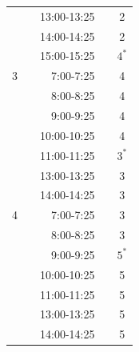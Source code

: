 \documentclass[12pt,a4paper,titlepage]{article}
\begin{document}
\begin{table}[!htb]
\begin{tabular}{lllll}
\multicolumn{1}{c}{} & \multicolumn{1}{c}{} & \multicolumn{1}{r}{13:00-13:25} & \multicolumn{1}{r}{} & \multicolumn{1}{c}{2} \\
\multicolumn{1}{c}{} & \multicolumn{1}{c}{} & \multicolumn{1}{r}{14:00-14:25} & \multicolumn{1}{r}{} & \multicolumn{1}{c}{2} \\
\multicolumn{1}{c}{} & \multicolumn{1}{c}{} & \multicolumn{1}{r}{15:00-15:25} & \multicolumn{1}{r}{} & \multicolumn{1}{c}{$4^*$} \\
\multicolumn{1}{c}{3} & \multicolumn{1}{c}{} & \multicolumn{1}{r}{7:00-7:25} & \multicolumn{1}{r}{} & \multicolumn{1}{c}{4} \\
\multicolumn{1}{c}{} & \multicolumn{1}{c}{} & \multicolumn{1}{r}{8:00-8:25} & \multicolumn{1}{r}{} & \multicolumn{1}{c}{4} \\
\multicolumn{1}{c}{} & \multicolumn{1}{c}{} & \multicolumn{1}{r}{9:00-9:25} & \multicolumn{1}{r}{} & \multicolumn{1}{c}{4} \\
\multicolumn{1}{c}{} & \multicolumn{1}{c}{} & \multicolumn{1}{r}{10:00-10:25} & \multicolumn{1}{r}{} & \multicolumn{1}{c}{4} \\
\multicolumn{1}{c}{} & \multicolumn{1}{c}{} & \multicolumn{1}{r}{11:00-11:25} & \multicolumn{1}{r}{} & \multicolumn{1}{c}{$3^*$} \\
\multicolumn{1}{c}{} & \multicolumn{1}{c}{} & \multicolumn{1}{r}{13:00-13:25} & \multicolumn{1}{r}{} & \multicolumn{1}{c}{3} \\
\multicolumn{1}{c}{} & \multicolumn{1}{c}{} & \multicolumn{1}{r}{14:00-14:25} & \multicolumn{1}{r}{} & \multicolumn{1}{c}{3} \\
\multicolumn{1}{c}{4} & \multicolumn{1}{c}{} & \multicolumn{1}{r}{7:00-7:25} & \multicolumn{1}{r}{} & \multicolumn{1}{c}{3} \\
\multicolumn{1}{c}{} & \multicolumn{1}{c}{} & \multicolumn{1}{r}{8:00-8:25} & \multicolumn{1}{r}{} & \multicolumn{1}{c}{3} \\
\multicolumn{1}{c}{} & \multicolumn{1}{c}{} & \multicolumn{1}{r}{9:00-9:25} & \multicolumn{1}{r}{} & \multicolumn{1}{c}{$5^*$} \\
\multicolumn{1}{c}{} & \multicolumn{1}{c}{} & \multicolumn{1}{r}{10:00-10:25} & \multicolumn{1}{r}{} & \multicolumn{1}{c}{5} \\
\multicolumn{1}{c}{} & \multicolumn{1}{c}{} & \multicolumn{1}{r}{11:00-11:25} & \multicolumn{1}{r}{} & \multicolumn{1}{c}{5} \\
\multicolumn{1}{c}{} & \multicolumn{1}{c}{} & \multicolumn{1}{r}{13:00-13:25} & \multicolumn{1}{r}{} & \multicolumn{1}{c}{5} \\
\multicolumn{1}{c}{} & \multicolumn{1}{c}{} & \multicolumn{1}{r}{14:00-14:25} & \multicolumn{1}{r}{} & \multicolumn{1}{c}{5} \\
\hline

\end{tabular}

\end{table}
\end{document}
